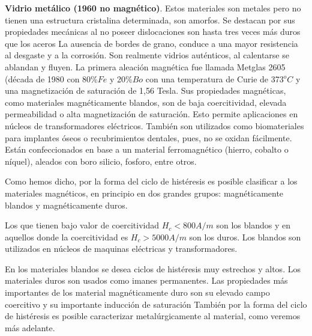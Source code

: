 \textbf{Vidrio metálico (1960 no magnético)}. Estos materiales son metales pero no tienen una estructura cristalina determinada, son amorfos. Se destacan por sus propiedades mecánicas al no poseer dislocaciones son hasta tres veces más duros que los aceros La ausencia de bordes de grano, conduce a una mayor resistencia al desgaste y a la corrosión. Son realmente vidrios auténticos, al calentarse se ablandan y fluyen. La primera aleación magnética fue llamada Metglas 2605 (década de 1980 con 80\%$Fe$ y 20\%$Bo$ con una temperatura de Curie de 373${^{o}C}$ y una magnetización de saturación de 1,56 Tesla. Sus propiedades magnéticas, como materiales magnéticamente blandos, son de baja coercitividad, elevada permeabilidad o alta magnetización de saturación. Esto permite aplicaciones en núcleos de transformadores eléctricos. También son utilizados como biomateriales para implantes óseos o recubrimientos dentales, pues, no se oxidan fácilmente. Están confeccionados en base a un material ferromagnético (hierro, cobalto o níquel), aleados con boro silicio, fosforo, entre otros.


Como hemos dicho, por la forma del ciclo de histéresis es posible clasificar a los materiales magnéticos, en principio en dos grandes grupos: magnéticamente blandos y magnéticamente duros.

Los que tienen bajo valor de coercitividad $H_{c}<800 A/m$ son los blandos y en aquellos donde la coercitividad es $H_{c} > 5000 A/m$ son los duros. Los blandos son utilizados en núcleos de maquinas eléctricas y transformadores. 

En los materiales blandos se desea ciclos de histéresis muy estrechos y altos. Los materiales duros son usados como imanes permanentes. Las propiedades más importantes de los material magnéticamente duro son su elevado campo coercitivo y su importante inducción de saturación También por la forma del ciclo de histéresis es posible caracterizar metalúrgicamente al material, como veremos más adelante.

